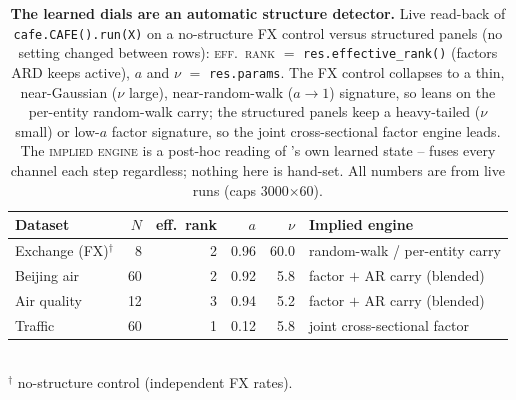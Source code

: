 \begin{table}[t]\centering\small
\setlength{\tabcolsep}{5pt}
\caption{\textbf{The learned dials are an automatic structure detector.} Live read-back of \texttt{cafe.CAFE().run(X)} on a no-structure FX control versus structured panels (no setting changed between rows): \textsc{eff.\ rank} $=$ \texttt{res.effective\_rank()} (factors ARD keeps active), $a$ and $\nu$ $=$ \texttt{res.params}. The FX control collapses to a thin, near-Gaussian ($\nu$ large), near-random-walk ($a{\to}1$) signature, so \cafe{} leans on the per-entity random-walk carry; the structured panels keep a heavy-tailed ($\nu$ small) or low-$a$ factor signature, so the joint cross-sectional factor engine leads. The \textsc{implied engine} is a post-hoc reading of \cafe{}'s own learned state -- \cafe{} fuses every channel each step regardless; nothing here is hand-set. All numbers are from live runs (caps 3000$\times$60).}
\label{tab:router}
\begin{tabular}{@{}lrrrrl@{}}
\toprule
Dataset & $N$ & eff.\ rank & $a$ & $\nu$ & Implied engine \\
\midrule
Exchange (FX)$^{\dagger}$ & 8 & 2 & 0.96 & 60.0 & random-walk / per-entity carry \\
Beijing air & 60 & 2 & 0.92 & 5.8 & factor $+$ AR carry (blended) \\
Air quality & 12 & 3 & 0.94 & 5.2 & factor $+$ AR carry (blended) \\
Traffic & 60 & 1 & 0.12 & 5.8 & joint cross-sectional factor \\
\bottomrule
\end{tabular}
\\[2pt]{\footnotesize $^{\dagger}$ no-structure control (independent FX rates).}
\end{table}
